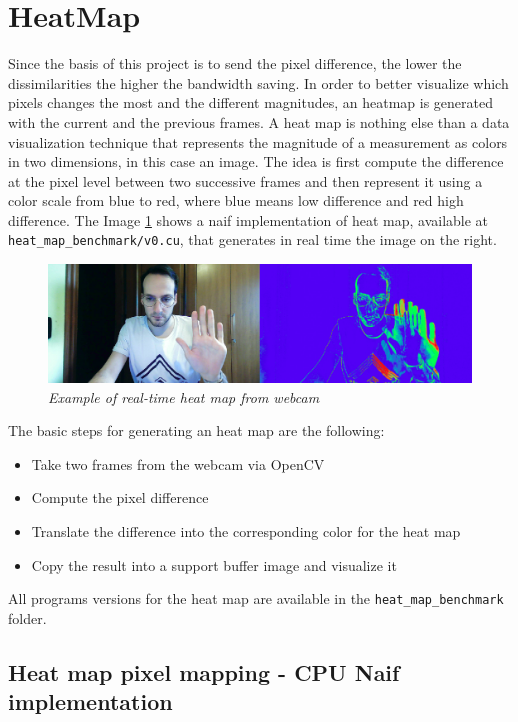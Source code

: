 \documentclass[paper=a4, fontsize=10pt]{scrartcl}	%
\begin{document}
	\section{HeatMap}
	Since the basis of this project is to send the pixel difference, the lower the dissimilarities the higher the bandwidth saving. In order to better visualize which pixels changes the most and the different magnitudes, an heatmap is generated with the current and the previous frames.\newline\newline	
	A heat map is nothing else than a data visualization technique that represents the magnitude of a measurement as colors in two dimensions, in this case an image. The idea is first compute the difference at the pixel level between two successive frames and then represent it using a color scale from blue to red, where blue means low difference and red high difference. The Image \ref{fig:heat_v0} shows a naif implementation of heat map, available at \texttt{heat\_map\_benchmark/v0.cu}, that generates in real time the image on the right.

	\begin{figure}[H]
		\centering
		\includegraphics[width=0.9\linewidth]{images/heatmap/v0}
		\caption{\textit{Example of real-time heat map from webcam}}
		\label{fig:heat_v0}
	\end{figure}
	The basic steps for generating an heat map are the following:
	\begin{itemize}
		\itemsep0sp
		\item Take two frames from the webcam via OpenCV
		\item Compute the pixel difference
		\item Translate the difference into the corresponding color for the heat map
		\item Copy the result into a support buffer image and visualize it
	\end{itemize}
	All programs versions for the heat map are available in the \texttt{heat\_map\_benchmark} folder.
	
	\subsection{Heat map pixel mapping - CPU Naif implementation}
	
\end{document}
